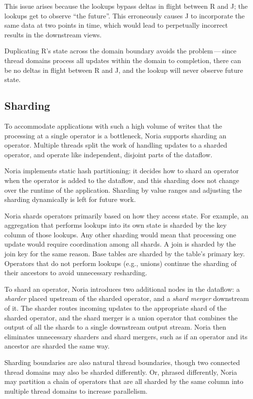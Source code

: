 This issue arises because the lookups bypass deltas in flight between R and J;
the lookups get to observe ``the future''. This erroneously causes J to
incorporate the same data at two points in time, which would lead to perpetually
incorrect results in the downstream views.

Duplicating R's state across the domain boundary avoids the problem\,---\,since
thread domains process all updates within the domain to completion, there can be
no deltas in flight between R and J, and the lookup will never observe future
state.

\subsection{Sharding}
\label{s:noria:sharding}

To accommodate applications with such a high volume of writes that the
processing at a single operator is a bottleneck, Noria supports sharding an
operator. Multiple threads split the work of handling updates to a sharded
operator, and operate like independent, disjoint parts of the dataflow.

Noria implements static hash partitioning: it decides how to shard an operator
when the operator is added to the dataflow, and this sharding does not change
over the runtime of the application. Sharding by value ranges and adjusting the
sharding dynamically is left for future work.

Noria shards operators primarily based on how they access state. For example, an
aggregation that performs lookups into its own state is sharded by the key
column of those lookups. Any other sharding would mean that processing one
update would require coordination among all shards. A join is sharded by the
join key for the same reason. Base tables are sharded by the table's primary
key. Operators that do not perform lookups (e.g., unions) continue the sharding
of their ancestors to avoid unnecessary resharding.

To shard an operator, Noria introduces two additional nodes in the dataflow: a
\emph{sharder} placed upstream of the sharded operator, and a \emph{shard
merger} downstream of it. The sharder routes incoming updates to the appropriate
shard of the sharded operator, and the shard merger is a union operator that
combines the output of all the shards to a single downstream output stream.
Noria then eliminates unnecessary sharders and shard mergers, such as if an
operator and its ancestor are sharded the same way.

Sharding boundaries are also natural thread boundaries, though two connected
thread domains may also be sharded differently. Or, phrased differently, Noria
may partition a chain of operators that are all sharded by the same column into
multiple thread domains to increase parallelism.

